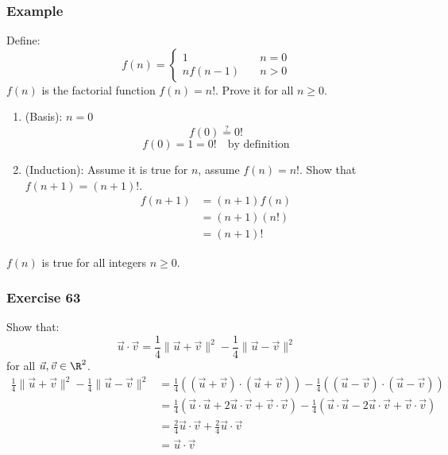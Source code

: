 \documentclass[letterpaper, 12pt]{math}
\begin{document}
\subsubsection*{Example}
Define:
\[ f(n) = \begin{cases}
  1 &\quad n = 0 \\
  nf(n-1) &\quad n > 0
\end{cases} \]
\( f(n) \) is the factorial function \( f(n) = n! \). Prove it for all \( n \ge
0 \).
\begin{enumerate}
  \item (Basis): \( n = 0 \)
    \[ f(0) \stackrel{?}{=} 0! \]
    \[ f(0) = 1 = 0! \quad \text{by definition} \]
  \item (Induction): Assume it is true for \( n \), assume \( f(n) = n! \).
    Show that \( f(n+1) = (n+1)! \).
    \begin{align*}
      f(n+1) &= (n+1)f(n) \\
      &= (n+1)(n!) \\
      &= (n+1)!
    \end{align*}
\end{enumerate}
\( f(n) \) is true for all integers \( n \ge 0 \).

\subsubsection*{Exercise 63}
Show that:
\[ \vec{u}\cdot\vec{v} = \frac{1}{4}\|\vec{u}+\vec{v}\|^2-
  \frac{1}{4}\|\vec{u}-\vec{v}\|^2 \]
for all \( \vec{u},\vec{v}\in\R^2 \).
\begin{align*}
  \frac{1}{4}\|\vec{u}+\vec{v}\|^2-\frac{1}{4}\|\vec{u}-\vec{v}\|^2
  &= \frac{1}{4}((\vec{u}+\vec{v})\cdot(\vec{u}+\vec{v}))-
    \frac{1}{4}((\vec{u}-\vec{v})\cdot(\vec{u}-\vec{v})) \\
  &= \frac{1}{4}(\vec{u}\cdot\vec{u}+2\vec{u}\cdot\vec{v}+\vec{v}\cdot\vec{v})-
    \frac{1}{4}(\vec{u}\cdot\vec{u}-2\vec{u}\cdot\vec{v}+\vec{v}\cdot\vec{v}) \\
  &= \frac{2}{4}\vec{u}\cdot\vec{v}+\frac{2}{4}\vec{u}\cdot\vec{v} \\
  &= \vec{u}\cdot\vec{v}
\end{align*}
\end{document}
